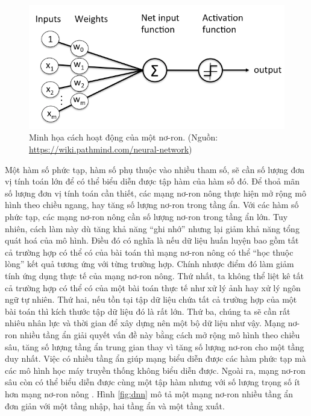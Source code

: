 \begin{figure}[htp]
	\centering
	\includegraphics[width=120 mm]{images/perceptron-node.png}
	\caption{Minh họa cách hoạt động của một nơ-ron. (Nguồn: \url{https://wiki.pathmind.com/neural-network})}
	\label{fig:perceptron-node}
\end{figure}

Một hàm số phức tạp, hàm số phụ thuộc vào nhiều tham số, sẽ cần số lượng đơn vị tính toán lớn để có thể biểu diễn được tập hàm của hàm số đó. Để thoả mãn số lượng đơn vị tính toán cần thiết, các mạng nơ-ron nông thực hiện mở rộng mô hình theo chiều ngang, hay tăng số lượng nơ-ron trong tầng ẩn. Với các hàm số phức tạp, các mạng nơ-ron nông cần số lượng nơ-ron trong tầng ẩn lớn. Tuy nhiên, cách làm này dù tăng khả năng ``ghi nhớ'' nhưng lại giảm khả năng tổng quát hoá của mô hình. Điều đó có nghĩa là nếu dữ liệu huấn luyện bao gồm tất cả trường hợp có thể có của bài toán thì mạng nơ-ron nông có thể ``học thuộc lòng'' kết quả tương ứng với từng trường hợp. Chính nhược điểm đó làm giảm tính ứng dụng thực tế của mạng nơ-ron nông. Thứ nhất, ta không thể liệt kê tất cả trường hợp có thể có của một bài toán thực tế như xử lý ảnh hay xử lý ngôn ngữ tự nhiên. Thứ hai, nếu tồn tại tập dữ liệu chứa tất cả trường hợp của một bài toán thì kích thước tập dữ liệu đó là rất lớn. Thứ ba, chúng ta sẽ cần rất nhiêu nhân lực và thời gian để xây dựng nên một bộ dữ liệu như vậy.  Mạng nơ-ron nhiều tầng ẩn giải quyết vấn đề này bằng cách mở rộng mô hình theo chiều sâu, tăng số lượng tầng ẩn trung gian thay vì tăng số lượng nơ-ron cho một tầng duy nhất. Việc có nhiều tầng ẩn giúp mạng biểu diễn được các hàm phức tạp mà các mô hình học máy truyền thống không biểu diễn được. Ngoài ra, mạng nơ-ron sâu còn có thể biểu diễn được cùng một tập hàm nhưng với số lượng trọng số ít hơn mạng nơ-ron nông \cite{bengio2009learning}. Hình \ref{fig:dnn} mô tả một mạng nơ-ron nhiều tầng ẩn đơn giản với một tầng nhập, hai tầng ẩn và một tầng xuất.

